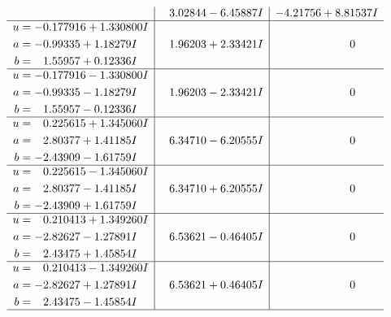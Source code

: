 \documentclass[1p]{elsarticle_modified}
\theoremstyle{definition}
\begin{document}
$$\begin{array}{c|c|c}
 & \phantom{-}3.02844 - 6.45887 I & -4.21756 + 8.81537 I \\ \hline\begin{aligned}
u &= -0.177916 + 1.330800 I \\
a &= -0.99335 + 1.18279 I \\
b &= \phantom{-}1.55957 + 0.12336 I\end{aligned}
 & \phantom{-}1.96203 + 2.33421 I & \phantom{-0.000000 } 0 \\ \hline\begin{aligned}
u &= -0.177916 - 1.330800 I \\
a &= -0.99335 - 1.18279 I \\
b &= \phantom{-}1.55957 - 0.12336 I\end{aligned}
 & \phantom{-}1.96203 - 2.33421 I & \phantom{-0.000000 } 0 \\ \hline\begin{aligned}
u &= \phantom{-}0.225615 + 1.345060 I \\
a &= \phantom{-}2.80377 + 1.41185 I \\
b &= -2.43909 - 1.61759 I\end{aligned}
 & \phantom{-}6.34710 - 6.20555 I & \phantom{-0.000000 } 0 \\ \hline\begin{aligned}
u &= \phantom{-}0.225615 - 1.345060 I \\
a &= \phantom{-}2.80377 - 1.41185 I \\
b &= -2.43909 + 1.61759 I\end{aligned}
 & \phantom{-}6.34710 + 6.20555 I & \phantom{-0.000000 } 0 \\ \hline\begin{aligned}
u &= \phantom{-}0.210413 + 1.349260 I \\
a &= -2.82627 - 1.27891 I \\
b &= \phantom{-}2.43475 + 1.45854 I\end{aligned}
 & \phantom{-}6.53621 - 0.46405 I & \phantom{-0.000000 } 0 \\ \hline\begin{aligned}
u &= \phantom{-}0.210413 - 1.349260 I \\
a &= -2.82627 + 1.27891 I \\
b &= \phantom{-}2.43475 - 1.45854 I\end{aligned}
 & \phantom{-}6.53621 + 0.46405 I & \phantom{-0.000000 } 0\\
 \hline 
 \end{array}$$\newpage$$\begin{array}{c|c|c}  

\end{array}$$
\end{document}

